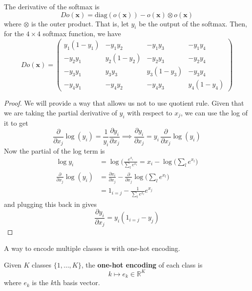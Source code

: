   \begin{lemma}
    The derivative of the softmax is 
    \begin{equation}
      D o (\mathbf{x}) = \mathrm{diag}(o (\mathbf{x})) - o (\mathbf{x}) \otimes o (\mathbf{x})
    \end{equation}
    where $\otimes$ is the outer product. That is, let $y_i$ be the output of the softmax. Then, for the $4 \times 4$ softmax function, we have 
    \begin{equation}
      D o(\mathbf{x}) = \begin{pmatrix} y_1 (1 - y_1) & - y_1 y_2 & -y_1 y_3 & - y_1 y_4 \\ -y_2 y_1 & y_2 (1 - y_2) & - y_2 y_3 & - y_2 y_4 \\ -y_3 y_1 & y_3 y_3 & y_3 (1 - y_3) & -y_3 y_4 \\ -y_4 y_1 & -y_4 y_2 & -y_4 y_3 & y_4 (1 - y_4) \end{pmatrix}
    \end{equation}
  \end{lemma}
  \begin{proof}
    We will provide a way that allows us not to use quotient rule. Given that we are taking the partial derivative of $y_i$ with respect to $x_j$, we can use the log of it to get 
    \[\frac{\partial}{\partial x_j} \log (y_i) = \frac{1}{y_i} \frac{\partial y_i}{\partial x_j} \implies \frac{\partial y_i}{\partial x_j} = y_i \, \frac{\partial}{\partial x_j} \log(y_i)\]
    Now the partial of the log term is 
    \begin{align}
      \log{y_i} & = \log \bigg( \frac{e^{x_i}}{\sum_l e^{x_l}} = x_i - \log \bigg( \sum_l e^{x_l}\bigg) \\
      \frac{\partial}{\partial x_j} \log(y_i) & = \frac{\partial x_i}{\partial x_j} - \frac{\partial}{\partial x_j} \log \bigg( \sum_l e^{x_l}\bigg) \\
      & = 1_{i = j} - \frac{1}{\sum_l e^{x_l}} e^{x_j}
    \end{align}
    and plugging this back in gives 
    \begin{equation}
      \frac{\partial y_i}{\partial x_j} = y_i (1_{i = j} - y_j)
    \end{equation}
  \end{proof} 

  A way to encode multiple classes is with one-hot encoding. 

  \begin{definition}
    Given $K$ classes $\{1, \ldots, K\}$, the \textbf{one-hot encoding} of each class is 
    \begin{equation}
      k \mapsto e_k \in \mathbb{R}^K
    \end{equation}
    where $e_k$ is the $k$th basis vector. 
  \end{definition} 

